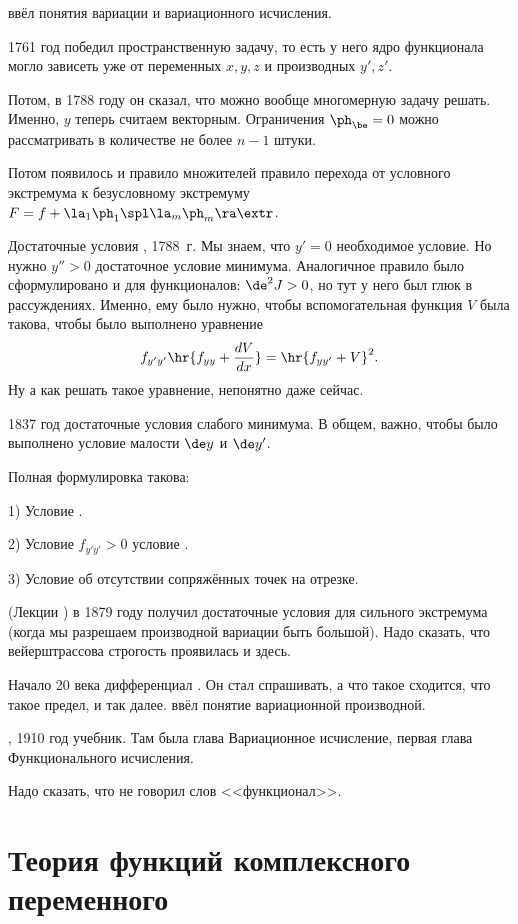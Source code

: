 \documentclass[a4paper,oneside,fleqn,10pt]{article}
\begin{document}
 ввёл понятия вариации и вариационного исчисления.

1761 год  победил пространственную задачу, то есть у
него ядро функционала могло зависеть уже от переменных $x,y,z$ и
производных $y', z'$.

Потом, в 1788 году он сказал, что можно вообще многомерную задачу
решать.  Именно, $y$ теперь считаем векторным. Ограничения $\ph_\be =
0$ можно рассматривать в количестве не более $n-1$ штуки.

Потом появилось и правило множителей  правило
перехода от условного экстремума к безусловному экстремуму $F = f +
\la_1 \ph_1\spl \la_m \ph_m \ra \extr$.

Достаточные условия , 1788~г. Мы знаем, что $y' = 0$
необходимое условие.  Но нужно $y''> 0$ достаточное условие минимума.
Аналогичное правило было сформулировано и для функционалов: $\de^2 J >
0$, но тут у него был глюк в рассуждениях. Именно, ему было нужно,
чтобы вспомогательная функция $V$ была такова, чтобы было выполнено
уравнение
$$f_{y'y'} \hr{f_{yy} + \frac{dV}{dx}} = \hr{f_{yy'} + V}^2.$$ Ну а
как решать такое уравнение, непонятно даже сейчас.

1837 год достаточные условия слабого минимума. В общем, важно, чтобы
было выполнено условие малости $\de y$ и $\de y'$.

Полная формулировка такова:

1) Условие .

2) Условие $f_{y'y'} > 0$ условие .

3) Условие  об отсутствии сопряжённых точек на отрезке.

 (Лекции ) в 1879 году получил
достаточные условия для сильного экстремума (когда мы разрешаем
производной вариации быть большой).  Надо сказать, что вейерштрассова
строгость проявилась и здесь.

Начало 20 века дифференциал . Он стал спрашивать, а что
такое сходится, что такое предел, и так далее.  ввёл
понятие вариационной производной.

, 1910 год учебник. Там была глава Вариационное
исчисление, первая глава Функционального исчисления.

Надо сказать, что  не говорил слов <<функционал>>.


\section{Теория функций комплексного переменного}
\end{document}
